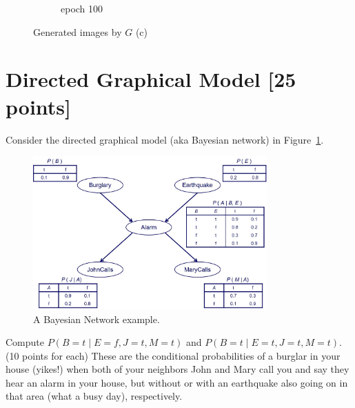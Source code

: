 \documentclass[a4paper]{article}
\theoremstyle{definition}
\newenvironment{soln}{
	\leavevmode\color{blue}\ignorespaces
}{}
\begin{document}
\begin{enumerate} [label=(\alph*)]
\begin{soln}
\begin{figure}[H]
\begin{subfigure}[b]{0.3\textwidth}
				      \caption{epoch 100}
			      \end{subfigure}
			      \caption*{Generated images by $G$ (c)}
		      \end{figure}
	      \end{soln}

\end{enumerate}

\pagebreak

\section{Directed Graphical Model [25 points]}
Consider the directed graphical model (aka Bayesian network) in Figure~\ref{fig:bn}.
\begin{figure}[H]
	\centering
	\includegraphics[width=0.8\textwidth]{BN.jpeg}
	\caption{A Bayesian Network example.}
	\label{fig:bn}
\end{figure}
Compute $P(B=t \mid E=f,J=t,M=t)$ and $P(B=t \mid E=t,J=t,M=t)$. (10 points for each) These are the conditional probabilities of a burglar in your house (yikes!) when both of your neighbors John and Mary call you and say they hear an alarm in your house, but without or with an earthquake also going on in that area (what a busy day), respectively.
\end{document}
